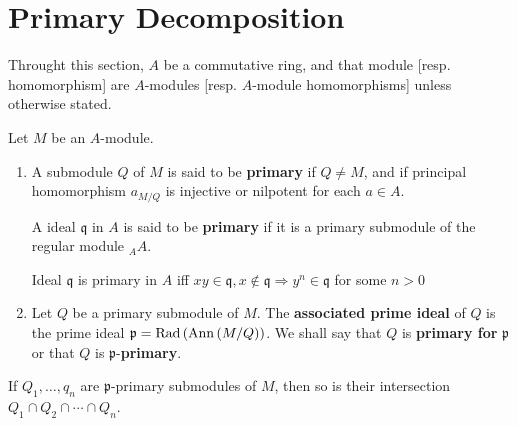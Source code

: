 \section{Primary Decomposition} %
Throught this section, $A$ be a commutative ring, and that module [resp. homomorphism] are $A$-modules [resp. $A$-module homomorphisms] unless otherwise stated.
\begin{definition}
    Let $M$ be an $A$-module.
    \begin{enumerate}
        \item
              A submodule $Q$ of $M$ is said to be \textbf{primary} if $Q \neq M$, and if principal homomorphism $a_{M/Q}$ is injective or nilpotent for each $a \in A$.

              A ideal $\mathfrak{q}$ in $A$ is said to be \textbf{primary} if it is a primary submodule of the regular module ${}_A A$.
              \begin{remark}



                  Ideal $\mathfrak{q}$ is primary in $A$ iff $x y \in \mathfrak{q} ,x\notin \mathfrak{q}\Rightarrow  y^n \in \mathfrak{q}$ for some $ n>0$
              \end{remark}
        \item
              Let $Q$ be a primary submodule of $M$. The \textbf{associated prime ideal} of $Q$ is the prime ideal $\mathfrak{p}=\operatorname{Rad}\left(\operatorname{\operatorname{Ann}}\left(M/Q\right)\right)$.
              We shall say that $Q$ is \textbf{primary for} $\mathfrak{p}$ or that $Q$ is $\mathfrak{p}$-\textbf{primary}.
    \end{enumerate}
\end{definition}


\begin{proposition}
    If $Q_1,\ldots,q_n$ are $\mathfrak{p}$-primary submodules of $M$, then so is their intersection $Q_1 \cap Q_2 \cap \cdots \cap Q_n$.
\end{proposition}


